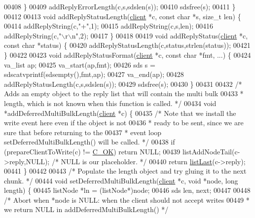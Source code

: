 \begin{DoxyCode}
00408     \}
00409     addReplyErrorLength(c,s,sdslen(s));
00410     sdsfree(s);
00411 \}
00412 
00413 \textcolor{keywordtype}{void} addReplyStatusLength(\hyperlink{structclient}{client} *c, \textcolor{keyword}{const} \textcolor{keywordtype}{char} *s, size\_t len) \{
00414     addReplyString(c,\textcolor{stringliteral}{"+"},1);
00415     addReplyString(c,s,len);
00416     addReplyString(c,\textcolor{stringliteral}{"\(\backslash\)r\(\backslash\)n"},2);
00417 \}
00418 
00419 \textcolor{keywordtype}{void} addReplyStatus(\hyperlink{structclient}{client} *c, \textcolor{keyword}{const} \textcolor{keywordtype}{char} *status) \{
00420     addReplyStatusLength(c,status,strlen(status));
00421 \}
00422 
00423 \textcolor{keywordtype}{void} addReplyStatusFormat(\hyperlink{structclient}{client} *c, \textcolor{keyword}{const} \textcolor{keywordtype}{char} *fmt, ...) \{
00424     va\_list ap;
00425     va\_start(ap,fmt);
00426     sds s = sdscatvprintf(sdsempty(),fmt,ap);
00427     va\_end(ap);
00428     addReplyStatusLength(c,s,sdslen(s));
00429     sdsfree(s);
00430 \}
00431 
00432 \textcolor{comment}{/* Adds an empty object to the reply list that will contain the multi bulk}
00433 \textcolor{comment}{ * length, which is not known when this function is called. */}
00434 \textcolor{keywordtype}{void} *addDeferredMultiBulkLength(\hyperlink{structclient}{client} *c) \{
00435     \textcolor{comment}{/* Note that we install the write event here even if the object is not}
00436 \textcolor{comment}{     * ready to be sent, since we are sure that before returning to the}
00437 \textcolor{comment}{     * event loop setDeferredMultiBulkLength() will be called. */}
00438     \textcolor{keywordflow}{if} (prepareClientToWrite(c) != \hyperlink{server_8h_a303769ef1065076e68731584e758d3e1}{C\_OK}) \textcolor{keywordflow}{return} NULL;
00439     listAddNodeTail(c->reply,NULL); \textcolor{comment}{/* NULL is our placeholder. */}
00440     \textcolor{keywordflow}{return} \hyperlink{adlist_8h_a5e0fad60032ef0fe9adcf9811e2f2fba}{listLast}(c->reply);
00441 \}
00442 
00443 \textcolor{comment}{/* Populate the length object and try gluing it to the next chunk. */}
00444 \textcolor{keywordtype}{void} setDeferredMultiBulkLength(\hyperlink{structclient}{client} *c, \textcolor{keywordtype}{void} *node, \textcolor{keywordtype}{long} length) \{
00445     listNode *ln = (listNode*)node;
00446     sds len, next;
00447 
00448     \textcolor{comment}{/* Abort when *node is NULL: when the client should not accept writes}
00449 \textcolor{comment}{     * we return NULL in addDeferredMultiBulkLength() */}

\end{DoxyCode}
